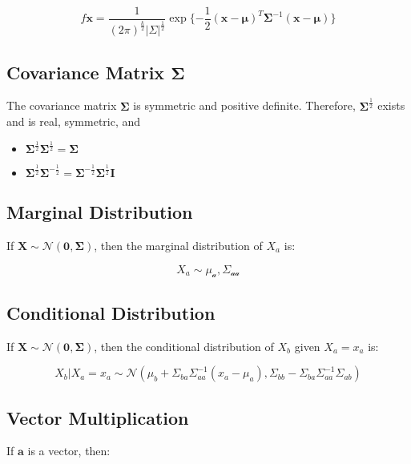 \begin{equation}
f{\mathbf{x}} = \frac{1}{(2\pi)^{\frac{k}{2}}|\Sigma|^{\frac{1}{2}}}\exp\{-\frac{1}{2}(\mathbf{x}-\mathbf{\mu})^T \mathbf{\Sigma}^{-1}(\mathbf{x}-\mathbf{\mu})\}
\end{equation}



\subsection{Covariance Matrix $\mathbf{\Sigma}$}
The covariance matrix $\mathbf{\Sigma}$ is symmetric and positive definite. Therefore, $\mathbf{\Sigma}^{\frac{1}{2}}$ exists and is real, symmetric, and

\begin{itemize}
\item $\mathbf{\Sigma}^{\frac{1}{2}}\mathbf{\Sigma}^{\frac{1}{2}} = \mathbf{\Sigma}$
\item $\mathbf{\Sigma}^{\frac{1}{2}}\mathbf{\Sigma}^{-\frac{1}{2}}=\mathbf{\Sigma}^{-\frac{1}{2}}\mathbf{\Sigma}^{\frac{1}{2}}\mathbf{I}$
\end{itemize}


\subsection{Marginal Distribution}
If $\mathbf{X} \sim \mathscr{N}(\mathbf{0},\mathbf{\Sigma})$, then the marginal distribution of $X_a$ is:

\begin{equation}
X_a \sim \mathscr{\mu_a,\Sigma_{aa}}
\end{equation}

\subsection{Conditional Distribution}
If $\mathbf{X} \sim \mathscr{N}(\mathbf{0},\mathbf{\Sigma})$, then the conditional distribution of $X_b$ given $X_a = x_a$ is:

\begin{equation}
X_b|X_a = x_a \sim \mathscr{N}(\mu_b + \Sigma_{ba}\Sigma_{aa}^{-1}(x_a - \mu_a), \Sigma_{bb}-\Sigma_{ba}\Sigma_{aa}^{-1}\Sigma_{ab}) 
\end{equation}

\subsection{Vector Multiplication}
If $\mathbf{a}$ is a vector, then:

